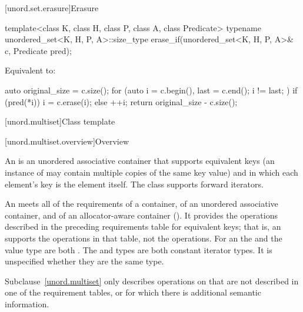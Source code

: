 [unord.set.erasure]{Erasure}

%
\begin{itemdecl}
template<class K, class H, class P, class A, class Predicate>
  typename unordered_set<K, H, P, A>::size_type
    erase_if(unordered_set<K, H, P, A>& c, Predicate pred);
\end{itemdecl}

\begin{itemdescr}
\pnum
\effects
Equivalent to:
\begin{codeblock}
auto original_size = c.size();
for (auto i = c.begin(), last = c.end(); i != last; ) {
  if (pred(*i)) {
    i = c.erase(i);
  } else {
    ++i;
  }
}
return original_size - c.size();
\end{codeblock}
\end{itemdescr}

[unord.multiset]{Class template }%

[unord.multiset.overview]{Overview}

\pnum
{}%
%
An  is an unordered associative container
that supports equivalent keys (an instance of  may contain
multiple copies of the same key value) and in which each element's key
is the element itself.
The  class
supports forward iterators.

\pnum
An  meets all of the requirements of a container, of an
unordered associative container, and of an allocator-aware container
(). It provides the operations described in the
preceding requirements table for equivalent keys; that is, an 
supports the  operations in that table, not the  operations.
For an  the  and the value type are
both . The  and  types are both
constant iterator types. It is unspecified whether they are the same type.

\pnum
Subclause~\ref{unord.multiset} only describes operations on  that
are not described in one of the requirement tables, or for which there
is additional semantic information.

